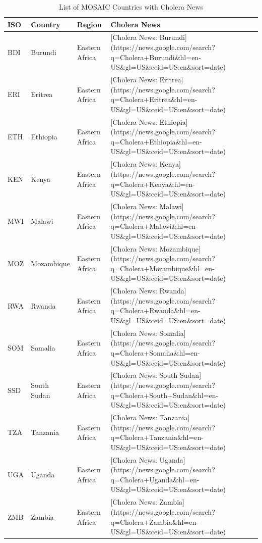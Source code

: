 \documentclass[
]{book}
\begin{document}
\begin{table}

\caption{\label{tab:mosaic-table}List of MOSAIC Countries with Cholera News}
\centering
\begin{tabular}[t]{l|l|l|l}
\hline
ISO & Country & Region & Cholera News\\
\hline
BDI & Burundi & Eastern Africa & [Cholera News: Burundi](https://news.google.com/search?q=Cholera+Burundi\&hl=en-US\&gl=US\&ceid=US:en\&sort=date)\\
\hline
ERI & Eritrea & Eastern Africa & [Cholera News: Eritrea](https://news.google.com/search?q=Cholera+Eritrea\&hl=en-US\&gl=US\&ceid=US:en\&sort=date)\\
\hline
ETH & Ethiopia & Eastern Africa & [Cholera News: Ethiopia](https://news.google.com/search?q=Cholera+Ethiopia\&hl=en-US\&gl=US\&ceid=US:en\&sort=date)\\
\hline
KEN & Kenya & Eastern Africa & [Cholera News: Kenya](https://news.google.com/search?q=Cholera+Kenya\&hl=en-US\&gl=US\&ceid=US:en\&sort=date)\\
\hline
MWI & Malawi & Eastern Africa & [Cholera News: Malawi](https://news.google.com/search?q=Cholera+Malawi\&hl=en-US\&gl=US\&ceid=US:en\&sort=date)\\
\hline
MOZ & Mozambique & Eastern Africa & [Cholera News: Mozambique](https://news.google.com/search?q=Cholera+Mozambique\&hl=en-US\&gl=US\&ceid=US:en\&sort=date)\\
\hline
RWA & Rwanda & Eastern Africa & [Cholera News: Rwanda](https://news.google.com/search?q=Cholera+Rwanda\&hl=en-US\&gl=US\&ceid=US:en\&sort=date)\\
\hline
SOM & Somalia & Eastern Africa & [Cholera News: Somalia](https://news.google.com/search?q=Cholera+Somalia\&hl=en-US\&gl=US\&ceid=US:en\&sort=date)\\
\hline
SSD & South Sudan & Eastern Africa & [Cholera News: South Sudan](https://news.google.com/search?q=Cholera+South+Sudan\&hl=en-US\&gl=US\&ceid=US:en\&sort=date)\\
\hline
TZA & Tanzania & Eastern Africa & [Cholera News: Tanzania](https://news.google.com/search?q=Cholera+Tanzania\&hl=en-US\&gl=US\&ceid=US:en\&sort=date)\\
\hline
UGA & Uganda & Eastern Africa & [Cholera News: Uganda](https://news.google.com/search?q=Cholera+Uganda\&hl=en-US\&gl=US\&ceid=US:en\&sort=date)\\
\hline
ZMB & Zambia & Eastern Africa & [Cholera News: Zambia](https://news.google.com/search?q=Cholera+Zambia\&hl=en-US\&gl=US\&ceid=US:en\&sort=date)\\

\end{tabular}
\end{table}
\end{document}
